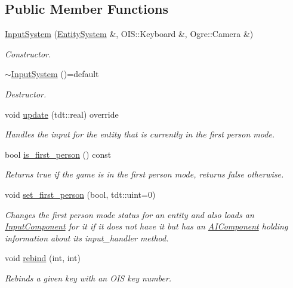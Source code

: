 \subsection*{Public Member Functions}
\begin{DoxyCompactItemize}
\item 
\hyperlink{class_input_system_aada2a62cbb74e5fdf669f6fb6ac4d933}{Input\+System} (\hyperlink{class_entity_system}{Entity\+System} \&, O\+I\+S\+::\+Keyboard \&, Ogre\+::\+Camera \&)
\begin{DoxyCompactList}\small\item\em Constructor. \end{DoxyCompactList}\item 
\hyperlink{class_input_system_a0d4dcf75be69044e88b17653925d35b7}{$\sim$\+Input\+System} ()=default
\begin{DoxyCompactList}\small\item\em Destructor. \end{DoxyCompactList}\item 
void \hyperlink{class_input_system_a6ee8dd556fa9352321197412b186c0c1}{update} (tdt\+::real) override
\begin{DoxyCompactList}\small\item\em Handles the input for the entity that is currently in the first person mode. \end{DoxyCompactList}\item 
bool \hyperlink{class_input_system_a6b551b82243b363066b6c309f95d8b4f}{is\+\_\+first\+\_\+person} () const 
\begin{DoxyCompactList}\small\item\em Returns true if the game is in the first person mode, returns false otherwise. \end{DoxyCompactList}\item 
void \hyperlink{class_input_system_a1784a34e02a24ef38712e5f3ef501581}{set\+\_\+first\+\_\+person} (bool, tdt\+::uint=0)
\begin{DoxyCompactList}\small\item\em Changes the first person mode status for an entity and also loads an \hyperlink{struct_input_component}{Input\+Component} for it if it does not have it but has an \hyperlink{struct_a_i_component}{A\+I\+Component} holding information about it\textquotesingle{}s input\+\_\+handler method. \end{DoxyCompactList}\item 
void \hyperlink{class_input_system_acec0ff323d487f721998975e4dc24959}{rebind} (int, int)
\begin{DoxyCompactList}\small\item\em Rebinds a given key with an O\+IS key number. \end{DoxyCompactList}\end{DoxyCompactItemize}
